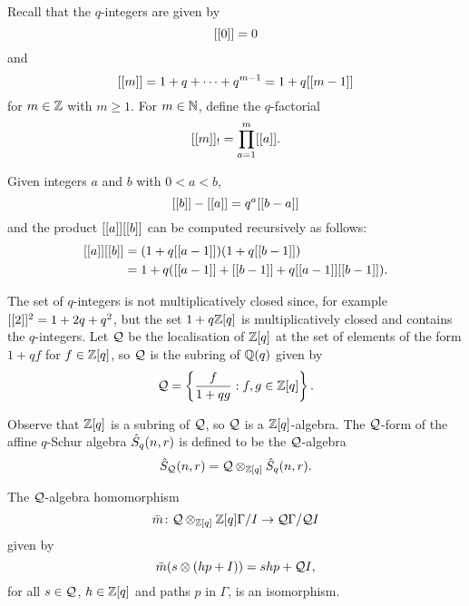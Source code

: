 \documentclass[a4paper, 11pt]{report}
\begin{document}
Recall that the $q$-integers are given by
\begin{equation*}
[[0]]=0
\end{equation*}
and
\begin{equation*}
[[m]] = 1+q+\cdots +q^{m-1} = 1+q[[m-1]]
\end{equation*}
for $m\in\mathbb{Z}$ with $m\geq 1$. For $m\in\mathbb{N}$, define the $q$-factorial
\begin{equation*}
[[m]]_! = \prod_{a=1}^{m}[[a]].
\end{equation*}

Given integers $a$ and $b$ with $0<a<b$,
\begin{equation*}
[[b]]-[[a]] = q^a[[b-a]]
\end{equation*}
and the product $[[a]][[b]]$ can be computed recursively as follows:
\begin{align*}
[[a]][[b]] &= (1+q[[a-1]])(1+q[[b-1]])\\
&= 1 +q([[a-1]] +[[b-1]] +q[[a-1]][[b-1]]).
\end{align*}

The set of $q$-integers is not multiplicatively closed since, for example $[[2]]^2 = 1+2q+q^2$, but the set $1+q\mathbb{Z}[q]$ is multiplicatively closed and contains the $q$-integers. Let $\mathcal{Q}$ be the localisation of $\mathbb{Z}[q]$ at the set of elements of the form $1+qf$ for $f\in\mathbb{Z}[q]$, so $\mathcal{Q}$ is the subring of $\mathbb{Q}(q)$ given by
\begin{equation*}
\mathcal{Q} = \left\{\frac{f}{1+qg}:f,g\in\mathbb{Z}[q]\right\}.
\end{equation*}

Observe that $\mathbb{Z}[q]$ is a subring of $\mathcal{Q}$, so $\mathcal{Q}$ is a $\mathbb{Z}[q]$-algebra. The $\mathcal{Q}$-form of the affine $q$-Schur algebra $\hat{S}_q(n,r)$ is defined to be the $\mathcal{Q}$-algebra
\begin{equation*} 
\hat{S}_{\mathcal{Q}}(n,r) = \mathcal{Q}\otimes_{\mathbb{Z}[q]}\hat{S}_q(n,r).
\end{equation*}

\begin{lemma}
The $\mathcal{Q}$-algebra homomorphism
\begin{equation*}
\bar{m}\colon \mathcal{Q}\otimes_{\mathbb{Z}[q]} \mathbb{Z}[q]\Gamma/{I}\to \mathcal{Q}\Gamma/{\mathcal{Q} I}
\end{equation*}
given by
\begin{equation*}
\bar{m}(s\otimes (hp+I)) = shp + \mathcal{Q} I,
\end{equation*}
for all $s\in\mathcal{Q}$, $h\in\mathbb{Z}[q]$ and paths $p$ in $\Gamma$, is an isomorphism.
\end{lemma}
\end{document}
